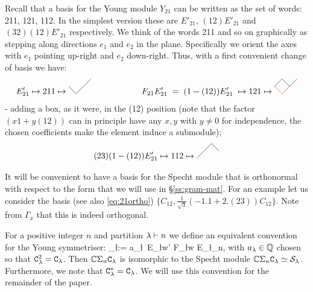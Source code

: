 Recall that a basis for the Young module 
$Y_{21}$  %
can be written as the set of words: 
211, 121, 112.  %
In the simplest version these are $E'_{21}$, $(12)E'_{21} $ and $(32)(12)E'_{21} $ respectively. 
We think of the words 211 and so on graphically as stepping along directions $e_1$ and $e_2$ in the plane. Specifically we orient the axes with $e_1$ pointing up-right and $e_2$ down-right. 
Thus, with a first convenient change of basis we have:  
\[
E'_{21} \mapsto 211 \mapsto 
\tp{.31}{\draw (0,0) -- (1,-1); \draw (1,-1) -- (2,0) -- (3,1);}
\hspace{2.1cm} 
F_{21}E'_{21} \; =\; (1-(12))E'_{21} \; \mapsto 121 
\mapsto \tp{.31}{\draw (0,0) -- (1,1); \draw (1,1) -- (2,0) -- (3,1); \draw [red] (0,0) -- (1,-1) -- (2,0);}  
\]
- adding a box, as it were, in the (12) position (note that the factor $(x1+y(12))$ can 
in principle have any $x,y$ with $y \neq 0$ for independence, the chosen coefficients make the element induce a submodule); 
\[ 
(23)(1-(12))E'_{21} \mapsto 112    
\mapsto \tp{.31}{\draw (0,0) -- (1,1); \draw (1,1) -- (2,2) -- (3,1);}  
\ignore{{
\hspace{1cm} 
(1-(12))E'_{21} \mapsto 121 
\mapsto \tp{.31}{\draw (0,0) -- (1,1); \draw (1,1) -- (2,0) -- (3,1);}  
\hspace{1cm} 
E'_{21} \mapsto 211 \mapsto 
\tp{.31}{\draw (0,0) -- (1,-1); \draw (1,-1) -- (2,0) -- (3,1);}
}}
\]

\mdef   \label{pa:21ortho}
It will be convenient to have a basis for the Specht module that is orthonormal with respect to the form that we will use in \S\ref{ss:gram-mat}. For an example let us consider the basis 
(see also \eqref{eq:21ortho})  %
$\{  C_{12} , \frac{1}{\sqrt{3}}(-1.1+2.(23))C_{12} \}$. 
Note from $\Gamma_x$ that this is indeed orthogonal. 

\mdef For a positive integer $n$ and partition $\lambda\vdash n$ we define an equivalent convention for the Young symmetriser:
\beq \nC_\l := a_\l \, E_\l w' F_\l w E_\l \in \C \Sym_{n},\label{eq:ccl}\eq
with $a_\lambda \in {\mathbb{Q}}$ chosen so that ${\mathtt{C}}_\lambda^2={\mathtt{C}}_\lambda$. Then $\mathbb{C} \Sigma_n {\mathtt{C}}_\lambda$ is isomorphic to the Specht module $\mathbb{C} \Sigma_n {\mathtt{C}}_\lambda \simeq \mathcal{S}_\lambda$. Furthermore, we note that ${\mathtt{C}}_\lambda^*={\mathtt{C}}_\lambda$. We will use this convention for the remainder of the paper.


